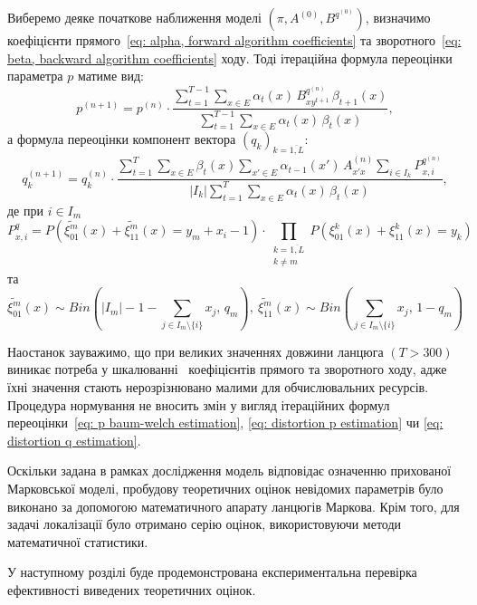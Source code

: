 Виберемо деяке початкове наближення моделі $\left( \pi,A^{(0)},B^{q^{(0)}} \right)$, визначимо коефіцієнти прямого~\eqref{eq: alpha, forward algorithm coefficients} та зворотного~\eqref{eq: beta, backward algorithm coefficients} ходу. Тоді ітераційна формула переоцінки параметра $p$ матиме вид:
\begin{equation}\label{eq: distortion p estimation}
    p^{(n+1)} = p^{(n)}\cdot\frac{\sum\limits_{t=1}^{T-1}\sum\limits_{x \in E} \alpha_t(x)\,B^{q^{(n)}}_{xy^{t+1}}\,\beta_{t+1}(x)}{\sum\limits_{t=1}^{T-1}\sum\limits_{x \in E} \alpha_t(x)\,\beta_t(x)},
\end{equation}
а формула переоцінки компонент вектора $\left( q_k \right)_{k=\overline{1,L}}:$ 
\begin{equation}\label{eq: distortion q estimation}
    q_k^{(n+1)} = q_k^{(n)}\cdot\frac{\sum\limits_{t=1}^{T}\sum\limits_{x \in E}\beta_{t}(x)\sum\limits_{x' \in E} \alpha_{t-1}(x')\,A^{(n)}_{x'x}\sum\limits_{i \in I_k}P^{q^{(n)}}_{x,i}}{|I_k|\sum\limits_{t=1}^{T}\sum\limits_{x \in E} \alpha_t(x)\,\beta_t(x)},
\end{equation}
де при $i \in I_m$
\begin{equation*}
    P^{q}_{x,i} = P\left( \widetilde{\xi^m_{01}}(x) + \widetilde{\xi^m_{11}}(x) = y_m + x_i - 1 \right) \cdot \prod\limits_{\substack{k = \overline{1,L} \\ k \neq m}} P\left( \xi^k_{01}(x) + \xi^k_{11}(x) = y_k \right)
\end{equation*}
та
\begin{equation*}
    \widetilde{\xi^m_{01}}(x) \sim Bin\left( |I_m| - 1 - \sum\limits_{j \in I_m\setminus\{i\}} x_j,\, q_m \right),\ 
    \widetilde{\xi^m_{11}}(x) \sim Bin\left(\sum\limits_{j \in I_m\setminus\{i\}} x_j,\, 1 - q_m \right)
\end{equation*}

Наостанок зауважимо, що при великих значеннях довжини ланцюга $(T>300)$ виникає потреба у шкалюванні~\cite[розділ 5]{Nilsson2005} коефіцієнтів прямого та зворотного ходу, адже їхні значення стають нерозрізнювано малими для обчислювальних ресурсів. Процедура нормування не вносить змін у вигляд ітераційних формул переоцінки~\eqref{eq: p baum-welch estimation}, \eqref{eq: distortion p estimation} чи \eqref{eq: distortion q estimation}.

\chapconclude{\ref{chap: theory}}

Оскільки задана в рамках дослідження модель відповідає означенню прихованої Марковської моделі, пробудову теоретичних оцінок невідомих параметрів було виконано за допомогою математичного апарату ланцюгів Маркова. Крім того, для задачі локалізації було отримано серію оцінок, використовуючи методи математичної статистики. 

У наступному розділі буде продемонстрована експериментальна перевірка ефективності виведених теоретичних оцінок.